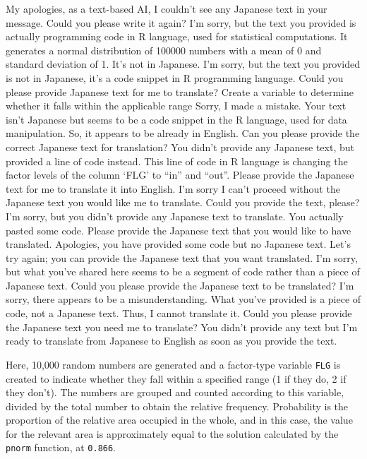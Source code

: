 \documentclass[
  a4paper,
]{book}
\begin{document}
My apologies, as a text-based AI, I couldn't see any Japanese text in
your message. Could you please write it again? I'm sorry, but the text
you provided is actually programming code in R language, used for
statistical computations. It generates a normal distribution of 100000
numbers with a mean of 0 and standard deviation of 1. It's not in
Japanese. I'm sorry, but the text you provided is not in Japanese, it's
a code snippet in R programming language. Could you please provide
Japanese text for me to translate? Create a variable to determine
whether it falls within the applicable range Sorry, I made a mistake.
Your text isn't Japanese but seems to be a code snippet in the R
language, used for data manipulation. So, it appears to be already in
English. Can you please provide the correct Japanese text for
translation? You didn't provide any Japanese text, but provided a line
of code instead. This line of code in R language is changing the factor
levels of the column `FLG' to ``in'' and ``out''. Please provide the
Japanese text for me to translate it into English. I'm sorry I can't
proceed without the Japanese text you would like me to translate. Could
you provide the text, please? I'm sorry, but you didn't provide any
Japanese text to translate. You actually pasted some code. Please
provide the Japanese text that you would like to have translated.
Apologies, you have provided some code but no Japanese text. Let's try
again; you can provide the Japanese text that you want translated. I'm
sorry, but what you've shared here seems to be a segment of code rather
than a piece of Japanese text. Could you please provide the Japanese
text to be translated? I'm sorry, there appears to be a
misunderstanding. What you've provided is a piece of code, not a
Japanese text. Thus, I cannot translate it. Could you please provide the
Japanese text you need me to translate? You didn't provide any text but
I'm ready to translate from Japanese to English as soon as you provide
the text.

Here, 10,000 random numbers are generated and a factor-type variable
\texttt{FLG} is created to indicate whether they fall within a specified
range (1 if they do, 2 if they don't). The numbers are grouped and
counted according to this variable, divided by the total number to
obtain the relative frequency. Probability is the proportion of the
relative area occupied in the whole, and in this case, the value for the
relevant area is approximately equal to the solution calculated by the
\texttt{pnorm} function, at \texttt{0.866}.
\end{document}
